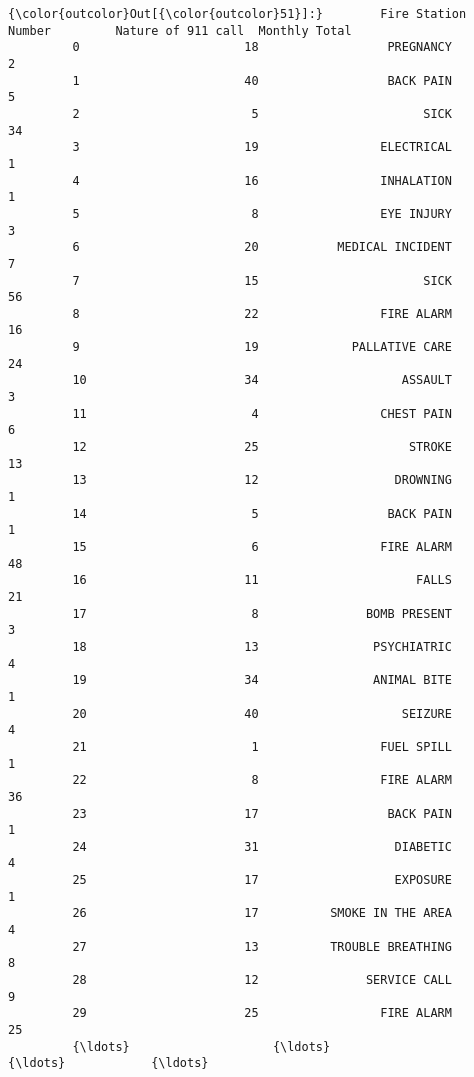 \documentclass[11pt]{article}
\begin{document}
\begin{Verbatim}[commandchars=\\\{\}]
{\color{outcolor}Out[{\color{outcolor}51}]:}        Fire Station Number         Nature of 911 call  Monthly Total
         0                       18                  PREGNANCY              2
         1                       40                  BACK PAIN              5
         2                        5                       SICK             34
         3                       19                 ELECTRICAL              1
         4                       16                 INHALATION              1
         5                        8                 EYE INJURY              3
         6                       20           MEDICAL INCIDENT              7
         7                       15                       SICK             56
         8                       22                 FIRE ALARM             16
         9                       19             PALLATIVE CARE             24
         10                      34                    ASSAULT              3
         11                       4                 CHEST PAIN              6
         12                      25                     STROKE             13
         13                      12                   DROWNING              1
         14                       5                  BACK PAIN              1
         15                       6                 FIRE ALARM             48
         16                      11                      FALLS             21
         17                       8               BOMB PRESENT              3
         18                      13                PSYCHIATRIC              4
         19                      34                ANIMAL BITE              1
         20                      40                    SEIZURE              4
         21                       1                 FUEL SPILL              1
         22                       8                 FIRE ALARM             36
         23                      17                  BACK PAIN              1
         24                      31                   DIABETIC              4
         25                      17                   EXPOSURE              1
         26                      17          SMOKE IN THE AREA              4
         27                      13          TROUBLE BREATHING              8
         28                      12               SERVICE CALL              9
         29                      25                 FIRE ALARM             25
         {\ldots}                    {\ldots}                        {\ldots}            {\ldots}

\end{Verbatim}
\end{document}
